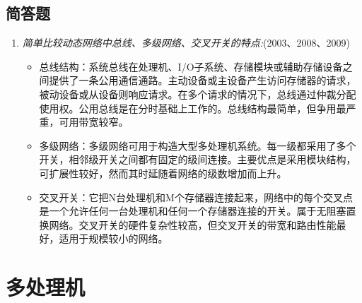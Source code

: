 \documentclass[a4paper]{ctexbook}
\begin{document}
\section{简答题}
\begin{enumerate}
  \item \emph{简单比较动态网络中总线、多级网络、交叉开关的特点:}(2003、2008、2009)
  \begin{itemize}
    \item 总线结构：系统总线在处理机、I/O子系统、存储模块或辅助存储设备之间提供了一条公用通信通路。主动设备或主设备产生访问存储器的请求，被动设备或从设备则响应请求。在多个请求的情况下，总线通过仲裁分配使用权。公用总线是在分时基础上工作的。总线结构最简单，但争用最严重，可用带宽较窄。
    \item 多级网络：多级网络可用于构造大型多处理机系统。每一级都采用了多个开关，相邻级开关之间都有固定的级间连接。主要优点是采用模块结构，可扩展性较好，然而其时延随着网络的级数增加而上升。
    \item 交叉开关：它把N台处理机和M个存储器连接起来，网络中的每个交叉点是一个允许任何一台处理机和任何一个存储器连接的开关。属于无阻塞置换网络。交叉开关的硬件复杂性较高，但交叉开关的带宽和路由性能最好，适用于规模较小的网络。
  \end{itemize}
  
\end{enumerate}

\newpage
\chapter{多处理机}
\end{document}
